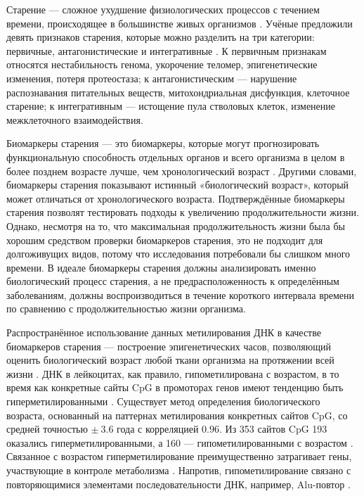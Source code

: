 Старение --- сложное ухудшение физиологических процессов с течением времени, происходящее в большинстве живых организмов \autocite{rose1994evolutionary}. Учёные предложили девять признаков старения, которые можно разделить на три категории: первичные, антагонистические и интегративные \autocite{LopezOtin2013}. К первичным признакам относятся нестабильность генома, укорочение теломер, эпигенетические изменения, потеря протеостаза; к антагонистическим --- нарушение распознавания питательных веществ, митохондриальная дисфункция, клеточное старение; к интегративным --- истощение пула стволовых клеток, изменение межклеточного взаимодействия. 

Биомаркеры старения --- это биомаркеры, которые могут прогнозировать функциональную способность отдельных органов и всего организма в целом в более позднем возрасте лучше, чем хронологический возраст \autocite{Baker1988}. Другими словами, биомаркеры старения показывают истинный «биологический возраст», который может отличаться от хронологического возраста. Подтверждённые биомаркеры старения позволят тестировать подходы к увеличению продолжительности жизни. Однако, несмотря на то, что максимальная продолжительность жизни была бы хорошим средством проверки биомаркеров старения, это не подходит для долгоживущих видов, потому что исследования потребовали бы слишком много времени. В идеале биомаркеры старения должны анализировать именно биологический процесс старения, а не предрасположенность к определённым заболеваниям, должны воспроизводиться в течение короткого интервала времени по сравнению с продолжительностью жизни организма.

Распространённое использование данных метилирования ДНК в качестве биомаркеров старения --- построение эпигенетических часов, позволяющий оценить биологический возраст любой ткани организма на протяжении всей жизни \autocite{Horvath2018}. ДНК в лейкоцитах, как правило, гипометилирована с возрастом, в то время как конкретные сайты CpG в промоторах генов имеют тенденцию быть гиперметилированными \autocite{Heyn2012, Gentilini2012}. Существует метод определения биологического возраста, основанный на паттернах метилирования конкретных сайтов CpG, со средней точностью $\pm~3.6$ года с корреляцией $0.96$. Из 353 сайтов CpG 193 оказались гиперметилированными, а 160 --- гипометилированными с возрастом \autocite{Horvath2013}. Связанное с возрастом гиперметилирование преимущественно затрагивает гены, участвующие в контроле метаболизма \autocite{Gentilini2012, Christensen2009}. Напротив, гипометилирование связано с повторяющимися элементами последовательности ДНК, например, Alu-повтор \autocite{Gentilini2012}.


